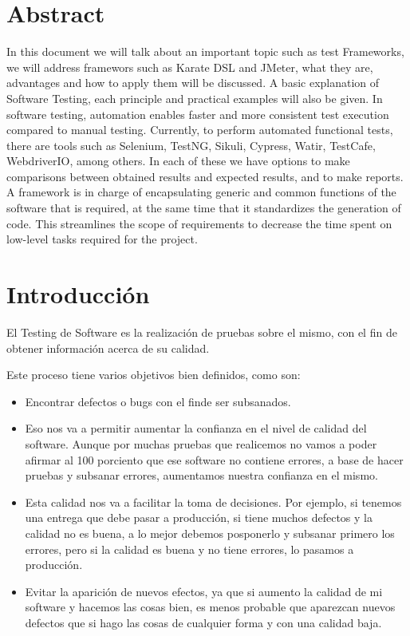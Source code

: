\documentclass{article}
\begin{document}
\section{Abstract}

In this document we will talk about an important topic such as test Frameworks, we will address framewors such as Karate DSL and JMeter, what they are, advantages and how to apply them will be discussed. A basic explanation of Software Testing, each principle and practical examples will also be given.
\newline
\newline
In software testing, automation enables faster and more consistent test execution compared to manual testing. Currently, to perform automated functional tests, there are tools such as Selenium, TestNG, Sikuli, Cypress, Watir, TestCafe, WebdriverIO, among others. In each of these we have options to make comparisons between obtained results and expected results, and to make reports.
\newline
\newline
A framework is in charge of encapsulating generic and common functions of the software that is required, at the same time that it standardizes the generation of code. This streamlines the scope of requirements to decrease the time spent on low-level tasks required for the project.

\section{Introducción}

El Testing de Software es la realización de pruebas sobre el mismo, con el fin de obtener información acerca de su calidad.

Este proceso tiene varios objetivos bien definidos, como son:

\begin{itemize}
    \item Encontrar defectos o bugs con el finde ser subsanados.
    
    \item Eso nos va a permitir aumentar la confianza en el nivel de calidad del software. Aunque por muchas pruebas que realicemos no vamos a poder afirmar al 100 porciento que ese software no contiene errores, a base de hacer pruebas y subsanar errores, aumentamos nuestra confianza en el mismo.
    
    \item Esta calidad nos va a facilitar la toma de decisiones. Por ejemplo, si tenemos una entrega que debe pasar a producción, si tiene muchos defectos y la calidad no es buena, a lo mejor debemos posponerlo y subsanar primero los errores, pero si la calidad es buena y no tiene errores, lo pasamos a producción.
    
    \item Evitar la aparición de nuevos efectos, ya que si aumento la calidad de mi software y hacemos las cosas bien, es menos probable que aparezcan nuevos defectos que si hago las cosas de cualquier forma y con una calidad baja.
    
    
\end{itemize} 
\end{document}
